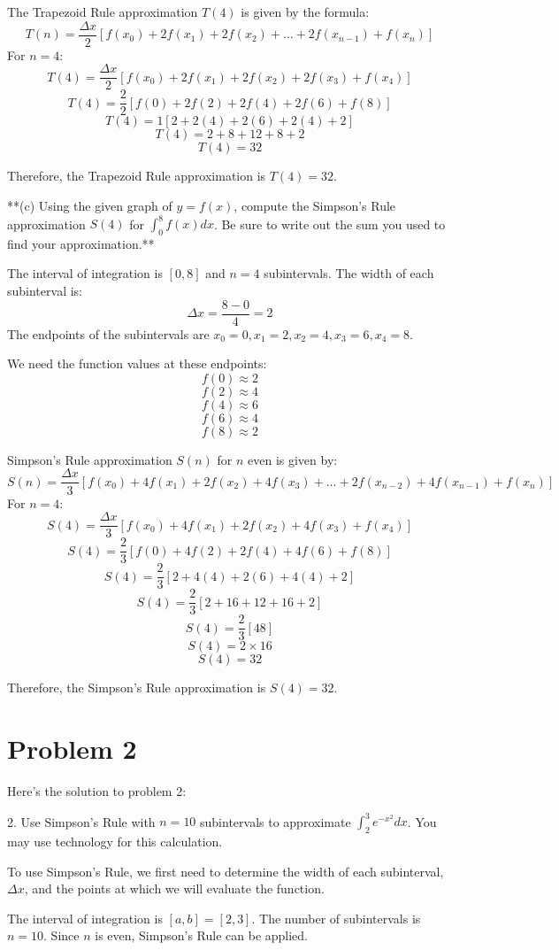 \documentclass{article}
\begin{document}
The Trapezoid Rule approximation $T(4)$ is given by the formula:
$$ T(n) = \frac{\Delta x}{2} [f(x_0) + 2f(x_1) + 2f(x_2) + \dots + 2f(x_{n-1}) + f(x_n)] $$
For $n=4$:
$$ T(4) = \frac{\Delta x}{2} [f(x_0) + 2f(x_1) + 2f(x_2) + 2f(x_3) + f(x_4)] $$
$$ T(4) = \frac{2}{2} [f(0) + 2f(2) + 2f(4) + 2f(6) + f(8)] $$
$$ T(4) = 1 [2 + 2(4) + 2(6) + 2(4) + 2] $$
$$ T(4) = 2 + 8 + 12 + 8 + 2 $$
$$ T(4) = 32 $$

Therefore, the Trapezoid Rule approximation is $T(4) = 32$.

**(c) Using the given graph of $y = f(x)$, compute the Simpson's Rule approximation $S(4)$ for $\int_{0}^{8} f(x)dx$. Be sure to write out the sum you used to find your approximation.**

The interval of integration is $[0, 8]$ and $n=4$ subintervals.
The width of each subinterval is:
$$ \Delta x = \frac{8 - 0}{4} = 2 $$
The endpoints of the subintervals are $x_0 = 0, x_1 = 2, x_2 = 4, x_3 = 6, x_4 = 8$.

We need the function values at these endpoints:
$$ f(0) \approx 2 $$
$$ f(2) \approx 4 $$
$$ f(4) \approx 6 $$
$$ f(6) \approx 4 $$
$$ f(8) \approx 2 $$

Simpson's Rule approximation $S(n)$ for $n$ even is given by:
$$ S(n) = \frac{\Delta x}{3} [f(x_0) + 4f(x_1) + 2f(x_2) + 4f(x_3) + \dots + 2f(x_{n-2}) + 4f(x_{n-1}) + f(x_n)] $$
For $n=4$:
$$ S(4) = \frac{\Delta x}{3} [f(x_0) + 4f(x_1) + 2f(x_2) + 4f(x_3) + f(x_4)] $$
$$ S(4) = \frac{2}{3} [f(0) + 4f(2) + 2f(4) + 4f(6) + f(8)] $$
$$ S(4) = \frac{2}{3} [2 + 4(4) + 2(6) + 4(4) + 2] $$
$$ S(4) = \frac{2}{3} [2 + 16 + 12 + 16 + 2] $$
$$ S(4) = \frac{2}{3} [48] $$
$$ S(4) = 2 \times 16 $$
$$ S(4) = 32 $$

Therefore, the Simpson's Rule approximation is $S(4) = 32$.

\newpage

\section*{Problem 2}
Here's the solution to problem 2:

2. Use Simpson's Rule with $n = 10$ subintervals to approximate $\int_2^3 e^{-x^2} dx$. You may use technology for this calculation.

To use Simpson's Rule, we first need to determine the width of each subinterval, $\Delta x$, and the points at which we will evaluate the function.

The interval of integration is $[a, b] = [2, 3]$.
The number of subintervals is $n = 10$.
Since $n$ is even, Simpson's Rule can be applied.
\end{document}
